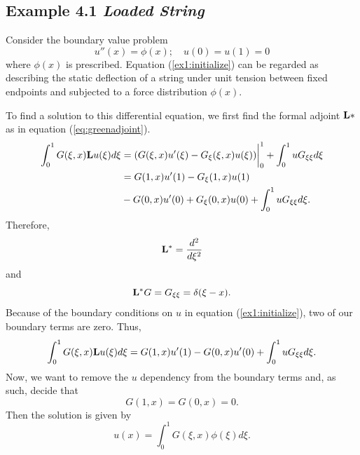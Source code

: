 \subsection{Example 4.1\textit{ Loaded String}} %
    
    Consider the boundary value problem
    \begin{equation} \label{ex1:initialize}
        u''(x) = \phi(x);\quad u(0)=u(1)=0
    \end{equation}
    where \(\phi(x)\) is prescribed. Equation (\ref{ex1:initialize}) can be regarded as describing the static deflection of a string under unit tension between fixed endpoints and subjected to a force distribution \(\phi(x)\).

    
    
    To find a solution to this differential equation, we first find the formal adjoint \(\mathrm{\bf{L}}*\) as in equation (\ref{eq:greenadjoint}). 
    \begin{equation}
        \begin{split}
            \int_{0}^{1} G(\xi, x)\mathrm{\bf{L}} u(\xi) d\xi  &= (G(\xi, x)u'(\xi)-G_\xi (\xi, x)u(\xi))\biggr\rvert_0^1 + \int_{0}^{1} uG_{\xi\xi}d\xi\\
            &= G(1, x)u'(1) - G_\xi(1, x)u(1) \\&- G(0, x)u'(0) + G_\xi(0,x)u(0) + \int_{0}^{1} uG_{\xi\xi}d\xi.
        \end{split}
    \end{equation}
    Therefore, 
    \begin{equation}
        \mathrm{\bf{L^*}} = \frac{d^2}{d\xi^2}
    \end{equation}
    and 
    \begin{equation}\label{eq:loadedStringLstarG}
        \mathrm{\bf{L^*}} G = G_{\xi\xi} = \delta(\xi-x).
    \end{equation}
    Because of the boundary conditions on \(u\) in equation (\ref{ex1:initialize}), two of our boundary terms are zero. Thus,
    \begin{equation}
        \int_{0}^{1} G(\xi, x)\mathrm{\bf{L}} u(\xi) d\xi = G(1, x)u'(1) - G(0, x)u'(0) + \int_{0}^{1} uG_{\xi\xi}d\xi.
    \end{equation}
    Now, we want to remove the \(u\) dependency from the boundary terms and, as such, decide that
    \begin{equation}
        G(1,x) = G(0,x) = 0.
    \end{equation}
    Then the solution is given by 
    \begin{equation}\label{eq:loadSln}
        u(x) = \int_0^1 G(\xi,x)\phi(\xi)d\xi.
    \end{equation}
